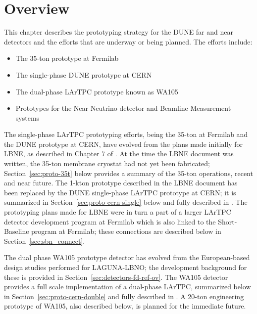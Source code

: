 \section{Overview}
\label{sec:proto-overview}


This chapter describes the prototyping strategy for the DUNE  far and near detectors and the efforts that are underway or being planned.  The efforts include:

\begin{itemize}
\item The 35-ton prototype at Fermilab
\item The single-phase DUNE prototype at CERN
\item The dual-phase LArTPC prototype known as WA105
\item Prototypes for the Near Neutrino detector and Beamline Measurement systems
\end{itemize}

The single-phase LArTPC prototyping efforts, being the 35-ton at Fermilab and the DUNE prototype at CERN, have evolved from the plans made initially for LBNE, as described in Chapter 7 of \anxlbnefd.  At the time the LBNE document was written, the 35-ton membrane cryostat had not yet been fabricated; Section~\ref{sec:proto-35t} below provides a summary of the 35-ton operations, recent and near future.  The 1-kton prototype described in the LBNE document has been replaced by the DUNE single-phase LArTPC prototype at CERN; it is summarized in Section~\ref{sec:proto-cern-single} below and fully described in \anxcernproto.  The prototyping plans made for LBNE were in turn a part of a larger LArTPC detector development program at Fermilab which is also linked to the Short-Baseline program at Fermilab; these connections are described below in Section~\ref{sec:sbn_connect}.

The dual phase WA105 prototype detector has evolved from the European-based design studies performed for LAGUNA-LBNO; the development background for these is provided in Section~\ref{sec:detectors-fd-ref-ov}.  The WA105 detector provides a full scale implementation of a dual-phase LArTPC, summarized below in Section~\ref{sec:proto-cern-double} and fully described in  \anxdualtdr.  A 20-ton engineering prototype of WA105, also described below, is planned for the immediate future.

